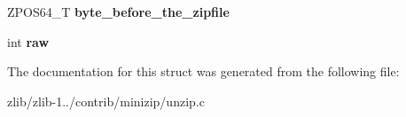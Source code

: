 \begin{DoxyCompactItemize}
\item 
\hypertarget{structfile__in__zip64__read__info__s_a2995eb52fc632b6047c372af3dbf1d74}{Z\+P\+O\+S64\+\_\+\+T {\bfseries byte\+\_\+before\+\_\+the\+\_\+zipfile}}\label{structfile__in__zip64__read__info__s_a2995eb52fc632b6047c372af3dbf1d74}

\item 
\hypertarget{structfile__in__zip64__read__info__s_a30297ce02b256c469e5c66c1500c17e1}{int {\bfseries raw}}\label{structfile__in__zip64__read__info__s_a30297ce02b256c469e5c66c1500c17e1}

\end{DoxyCompactItemize}


The documentation for this struct was generated from the following file\+:\begin{DoxyCompactItemize}
\item 
zlib/zlib-\/1../contrib/minizip/unzip.\+c\end{DoxyCompactItemize}
